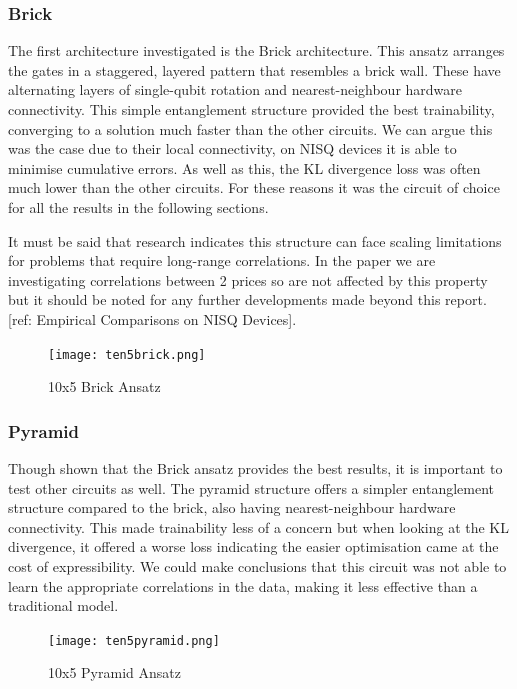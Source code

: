 \documentclass[12pt]{article}
\newcommand{\newp}
    {
    \vskip 0.5cm 
  }
\numberwithin{equation}{section}
\begin{document}
\subsubsection{Brick}
The first architecture investigated is the Brick architecture. This ansatz arranges
the gates in a staggered, layered pattern that resembles a brick wall. These 
have alternating layers of single-qubit rotation and nearest-neighbour hardware
connectivity. This simple
entanglement structure provided the best trainability, converging to a solution 
much faster than the other circuits. We can argue this was the case due to 
their local connectivity, on NISQ devices it is able to minimise cumulative 
errors. 
As well as this, the KL divergence loss was 
often much lower than the other circuits. For these reasons it was the circuit 
of choice for all the results in the following sections.
\newp 
It must be said that research indicates this structure can face scaling limitations 
for problems that require long-range correlations. In the paper we are investigating 
correlations between 2 prices so are not affected by this property but it should 
be noted for any further developments made beyond this report. [ref:  Empirical Comparisons on NISQ Devices]. 

\begin{figure}[h!]
  \centering 
  \texttt{[image: ten5brick.png]}
  \caption{10x5 Brick Ansatz}
  \label{fig:brick}
\end{figure}

\subsubsection{Pyramid}
Though shown that the Brick ansatz provides the best results, it is important to 
test other circuits as well. The pyramid structure offers a simpler entanglement 
structure compared to the brick, also having nearest-neighbour hardware 
connectivity. This made trainability less of a concern but 
when looking at the KL divergence, it offered a worse loss indicating the 
easier optimisation came at the cost of expressibility. We could make conclusions 
that this circuit was not able to learn the appropriate correlations in the data,
making it less effective than a traditional model. 
\begin{figure}[h!]
  \centering 
  \texttt{[image: ten5pyramid.png]}
  \caption{10x5 Pyramid Ansatz}
  \label{fig:pyramid}
\end{figure}

\newpage
\end{document}
